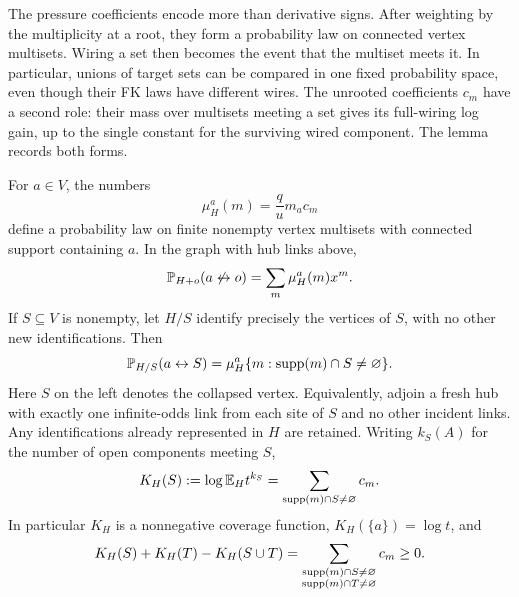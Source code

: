The pressure coefficients encode more than derivative signs. After
weighting by the multiplicity at a root, they form a probability law
on connected vertex multisets. Wiring a set then becomes the event
that the multiset meets it. In particular, unions of target sets can
be compared in one fixed probability space, even though their FK laws
have different wires. The unrooted coefficients $c_m$ have a second
role: their mass over multisets meeting a set gives its full-wiring
log gain, up to the single constant for the surviving wired component.
The lemma records both forms.

\begin{lemma}
\label{lem:rooted}
For $a\in V$, the numbers
\begin{equation}
 \mu_H^a(m)=\frac q u m_a c_m
 \label{pressure:rooted-law}
\end{equation}
define a probability law on finite nonempty vertex multisets with
connected support containing $a$. In the graph with hub links above,
\begin{equation}
 \mathbb P_{H+o}(a\not\leftrightarrow o)
   =\sum_m\mu_H^a(m)x^m.
 \label{pressure:rooted-nonconnection}
\end{equation}
If $S\subseteq V$ is nonempty, let $H/S$ identify precisely the
vertices of $S$, with no other new identifications. Then
\begin{equation}
 \mathbb P_{H/S}(a\leftrightarrow S)
  =\mu_H^a\{m:\operatorname{supp}(m)\cap S\ne\varnothing\}.
 \label{pressure:rooted-hit}
\end{equation}
Here $S$ on the left denotes the collapsed vertex. Equivalently,
adjoin a fresh hub with exactly one infinite-odds link from each site
of $S$ and no other incident links.
Any identifications already represented in $H$ are retained.
Writing $k_S(A)$ for the number of open components meeting $S$,
\begin{equation}
 K_H(S):=\log\mathbb E_H t^{k_S}
  =\sum_{\operatorname{supp}(m)\cap S\ne\varnothing}c_m.
 \label{pressure:coverage}
\end{equation}
In particular $K_H$ is a nonnegative coverage function,
$K_H(\{a\})=\log t$, and
\begin{equation}
 K_H(S)+K_H(T)-K_H(S\cup T)
 =\sum_{\substack{\operatorname{supp}(m)\cap S\ne\varnothing\\
                   \operatorname{supp}(m)\cap T\ne\varnothing}}c_m\ge0.
 \label{pressure:double-coverage}
\end{equation}
\end{lemma}

